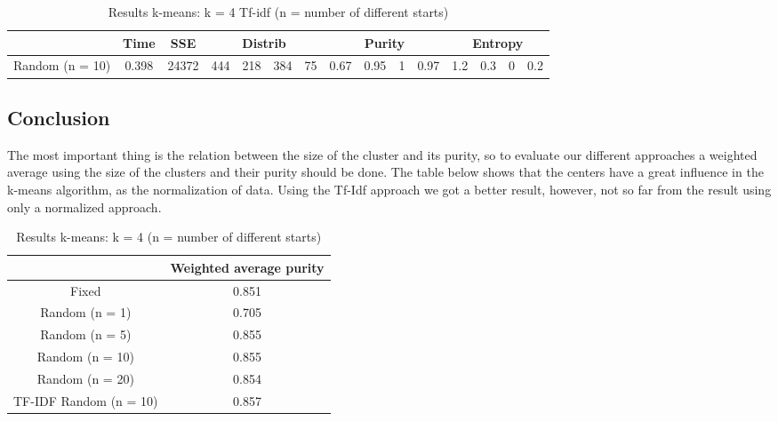 \documentclass[a4paper,11pt]{article}
\begin{document}
\begin{table}[ht!]
  \caption{Results k-means: k = 4 Tf-idf (n = number of different starts)}
  \begin{centering}
    \begin{tabular}{|c|c|c|c|c|c|c|c|c|c|c|c|c|c|c|}
      \cline{2-15} 
      \multicolumn{1}{c|}{} & Time & SSE & \multicolumn{4}{c|}{Distrib} & \multicolumn{4}{c|}{Purity} & \multicolumn{4}{c|}{Entropy}\tabularnewline
      \hline 
      Random (n = 10) & 0.398 & 24372 & 444 & 218 & 384 & 75 & 0.67 & 0.95 & 1 & 0.97 & 1.2 & 0.3 & 0 & 0.2\tabularnewline
      \hline 
    \end{tabular}
    \par\end{centering}
  \label{tab:tfidf}
\end{table}

\subsection{Conclusion}

The most important thing is the relation between the size of the cluster and its
purity, so  to evaluate  our different approaches  a weighted average  using the
size of the clusters and their purity should be done. 
The table  below shows that  the centers have  a great influence in  the k-means
algorithm, as the normalization of data.
Using the Tf-Idf approach  we got a better result, however, not  so far from the
result using only a normalized approach.

\begin{table}[ht!]
  \caption{Results k-means: k = 4 (n = number of different starts)}
  \begin{centering}
    \begin{tabular}{|c|c|}
      \cline{2-2}
      \multicolumn{1}{c|}{} & Weighted average purity\tabularnewline
      \hline 
      Fixed & 0.851 \tabularnewline
      \hline 
      Random (n = 1) & 0.705\tabularnewline
      \hline 
      Random (n = 5) & 0.855\tabularnewline
      \hline 
      Random (n = 10) & 0.855\tabularnewline
      \hline 
      Random (n = 20) &  0.854\tabularnewline
      \hline 
      TF-IDF Random (n = 10) & 0.857\tabularnewline
      \hline 
    \end{tabular}
    \par\end{centering}
\end{table}


\nocite{HT}
\nocite{WIKI1}
\nocite{STD}

\begin{small}
  
\end{small}
\section*{}
\end{document}
